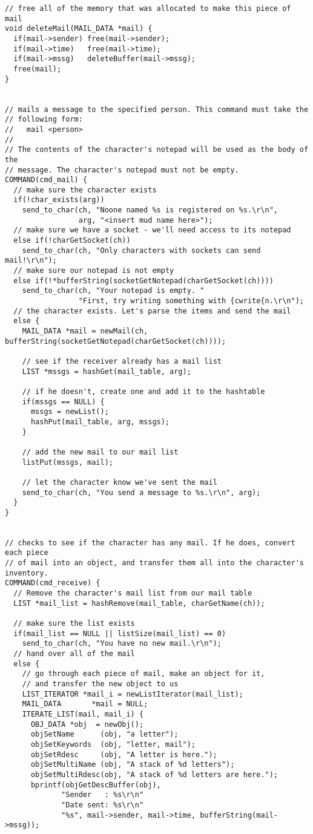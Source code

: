 \documentclass[12pt]{article}
\begin{document}
{\begin{verbatim}
// free all of the memory that was allocated to make this piece of mail
void deleteMail(MAIL_DATA *mail) {
  if(mail->sender) free(mail->sender);
  if(mail->time)   free(mail->time);
  if(mail->mssg)   deleteBuffer(mail->mssg);
  free(mail);
}


// mails a message to the specified person. This command must take the 
// following form:
//   mail <person>
//
// The contents of the character's notepad will be used as the body of the
// message. The character's notepad must not be empty.
COMMAND(cmd_mail) {
  // make sure the character exists
  if(!char_exists(arg))
    send_to_char(ch, "Noone named %s is registered on %s.\r\n",
                 arg, "<insert mud name here>");
  // make sure we have a socket - we'll need access to its notepad
  else if(!charGetSocket(ch))
    send_to_char(ch, "Only characters with sockets can send mail!\r\n");
  // make sure our notepad is not empty
  else if(!*bufferString(socketGetNotepad(charGetSocket(ch))))
    send_to_char(ch, "Your notepad is empty. "
                 "First, try writing something with {cwrite{n.\r\n");
  // the character exists. Let's parse the items and send the mail
  else {
    MAIL_DATA *mail = newMail(ch, bufferString(socketGetNotepad(charGetSocket(ch))));
    
    // see if the receiver already has a mail list
    LIST *mssgs = hashGet(mail_table, arg);
    
    // if he doesn't, create one and add it to the hashtable
    if(mssgs == NULL) {
      mssgs = newList();
      hashPut(mail_table, arg, mssgs);
    }

    // add the new mail to our mail list
    listPut(mssgs, mail);

    // let the character know we've sent the mail
    send_to_char(ch, "You send a message to %s.\r\n", arg);
  }
}


// checks to see if the character has any mail. If he does, convert each piece
// of mail into an object, and transfer them all into the character's inventory.
COMMAND(cmd_receive) {
  // Remove the character's mail list from our mail table
  LIST *mail_list = hashRemove(mail_table, charGetName(ch));

  // make sure the list exists
  if(mail_list == NULL || listSize(mail_list) == 0)
    send_to_char(ch, "You have no new mail.\r\n");
  // hand over all of the mail
  else {
    // go through each piece of mail, make an object for it, 
    // and transfer the new object to us
    LIST_ITERATOR *mail_i = newListIterator(mail_list);
    MAIL_DATA       *mail = NULL;
    ITERATE_LIST(mail, mail_i) {
      OBJ_DATA *obj  = newObj();
      objSetName      (obj, "a letter");
      objSetKeywords  (obj, "letter, mail");
      objSetRdesc     (obj, "A letter is here.");
      objSetMultiName (obj, "A stack of %d letters");
      objSetMultiRdesc(obj, "A stack of %d letters are here.");
      bprintf(objGetDescBuffer(obj),
             "Sender   : %s\r\n"
             "Date sent: %s\r\n"
             "%s", mail->sender, mail->time, bufferString(mail->mssg));
      

\end{verbatim}}
\end{document}
